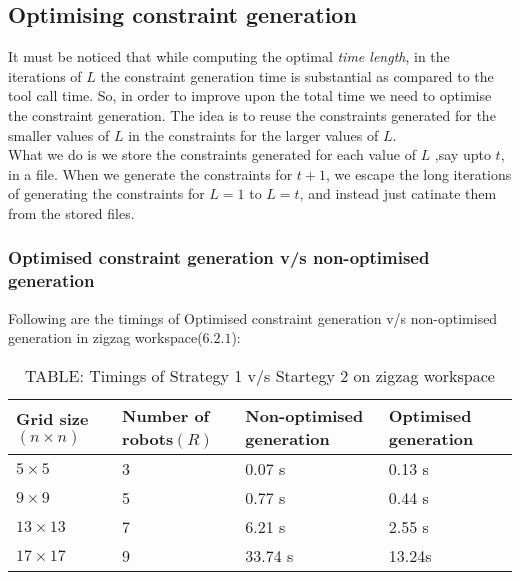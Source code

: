 \documentclass{article}[11pt]
\begin{document}
		\subsection{Optimising constraint generation}
			It must be noticed that while computing the optimal \textit{time length}, in the iterations of $L$ the constraint generation time is substantial as compared to the tool call time. So, in order to improve upon the total time we need to optimise the constraint generation. The idea is to reuse the constraints generated for the smaller values of $L$ in the constraints for the larger values of $L$.\\

			What we do is we store the constraints generated for each value of $L$ ,say upto $t$, in a file. When we generate the constraints for $t+1$, we escape the long iterations of generating the constraints for $L=1$ to $L=t$, and instead just catinate them from the stored files.

			\subsubsection{Optimised constraint generation v/s non-optimised generation}
			Following are the timings of Optimised constraint generation v/s non-optimised generation in zigzag workspace($6.2.1$):
				\begin{table}[h!]
				\centering
				\begin{tabular}{|| p{2cm} | p{2cm} | p{2cm} | p{2cm} ||} 
				 \hline\hline
				 Grid size$(n \times n)$ & Number of robots$(R)$ & Non-optimised generation & Optimised generation \\ [0.5ex] 
				 \hline\hline
				 $5 \times 5$ & 3 & 0.07 s & 0.13 s\\ 
				 $9 \times 9$ & 5  & 0.77 s & 0.44 s\\
				 $13 \times 13$ & 7  & 6.21 s & 2.55 s\\
				 $17 \times 17$ & 9  & 33.74 s & 13.24s \\ [1ex]
				 \hline
				\end{tabular}
				\caption*{TABLE: Timings of Strategy 1 v/s Startegy 2 on zigzag workspace}
				\end{table}
\end{document}
